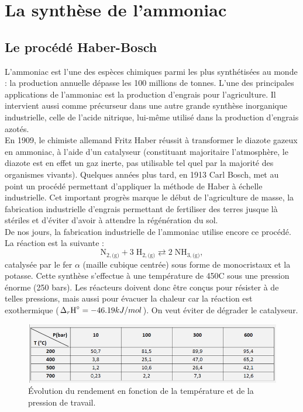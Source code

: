 \documentclass[11pt,a4paper]{report}
\begin{document}
\newpage
\section{La synthèse de l'ammoniac}\label{sec:3}

\subsection{Le procédé Haber-Bosch}

L'ammoniac est l'une des espèces chimiques parmi les plus synthétisées au monde : la production annuelle dépasse les 100 millions de tonnes. L'une des principales applications de l'ammoniac est la production d'engrais pour l'agriculture. Il intervient aussi comme précurseur dans une autre grande synthèse inorganique industrielle, celle de l'acide nitrique, lui-même utilisé dans la production d'engrais azotés.\\

En 1909, le chimiste allemand Fritz Haber réussit à transformer le diazote gazeux en ammoniac, à l'aide d'un catalyseur (constituant majoritaire l'atmosphère, le diazote est en effet un gaz inerte, pas utilisable tel quel par la majorité des organismes vivants). Quelques années plus tard, en 1913 Carl Bosch, met au point un procédé permettant d'appliquer la méthode de Haber à échelle industrielle. Cet important progrès marque le début de l'agriculture de masse, la fabrication industrielle d'engrais permettant de fertiliser des terres jusque là stériles et d'éviter d'avoir à attendre la régénération du sol.\\

De nos jours, la fabrication industrielle de l'ammoniac utilise encore ce procédé. La réaction est la suivante :
\begin{equation}
	\boxed{\text{N}_{2,\text{(g)}} + 3\;\text{H}_{2,\text{(g)}} 
	\rightleftarrows 2\;\text{NH}_{3,\text{(g)}}},
\end{equation}
catalysée par le fer $\alpha$ (maille cubique centrée) sous forme de monocristaux et la potasse. Cette synthèse s'effectue à une température de 450\degree C sous une pression énorme (250 bars). Les réacteurs doivent donc être conçus pour résister à de telles pressions, mais aussi pour évacuer la chaleur car la réaction est exothermique ($\Delta_r\text{H}\degree = -46.19 kJ/mol$). On veut éviter de dégrader le catalyseur.

\begin{figure}[h!]
	\begin{center}
  		\includegraphics[scale = 0.7]{tableau_data}
		\caption{Évolution du rendement en fonction de la température et de la pression de 					travail.}
	\end{center}
\end{figure}
\end{document}
